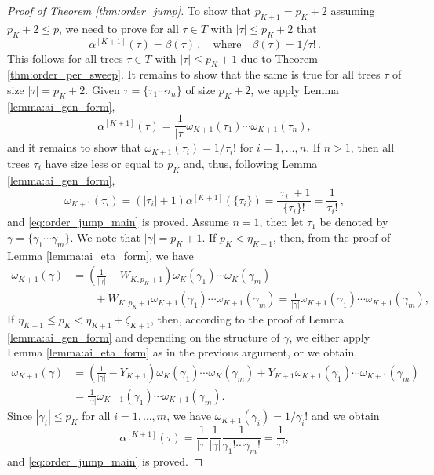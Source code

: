 \documentclass[sn-mathphys-num]{sn-jnl}%
\newcommand{\reva}[1]{#1}%
\theoremstyle{thmstyleone}%
\theoremstyle{thmstyletwo}%
\theoremstyle{thmstylethree}%
\begin{document}
\begin{proof}[Proof of Theorem \ref{thm:order_jump}]
    To show that $p_{K+1} = p_K + 2$ assuming $p_K + 2 \leq p$, we need to prove for all $\tau \in T$ with $|\tau| \leq p_K + 2$ that
    \begin{equation}
        \label{eq:order_jump_main}
        \reva{\alpha^{[K+1]}(\tau) = \beta(\tau) \,, \quad \text{where} \quad \beta(\tau) = 1/\tau! \,.}
    \end{equation}
    This follows for all trees $\tau \in T$ with $|\tau| \leq p_K + 1$ due to Theorem \ref{thm:order_per_sweep}. It remains to show that the same is true for all trees $\tau$ of size $|\tau| = p_K + 2$. 
    \reva{Given $\tau = \reva{\{\tau_1 \cdots \tau_n\}}$ of size $p_K + 2$, we apply Lemma \ref{lemma:ai_gen_form},}
    \[ \alpha^{[K+1]}(\tau) = \frac{1}{|\tau|} \reva{\omega_{K+1}(\tau_1) \cdots \omega_{K+1}(\tau_n)}, \]
    and it remains to show that $\omega_{K+1} (\tau_i) = 1/\tau_i!$ for $i= 1, \dots, n$.
    If $n > 1$, then all trees $\tau_i$ have size less or equal to $p_K$ and, \reva{thus, following Lemma \ref{lemma:ai_gen_form},
    \[ \omega_{K+1}(\tau_i) = (|\tau_i| + 1) \alpha^{[K+1]} (\{\tau_i\}) = \frac{|\tau_i| + 1}{\{\tau_i\}!} = \frac1{\tau_i!} \,, \]
and \eqref{eq:order_jump_main} is proved}. Assume $n = 1$, then let $\tau_1$ be denoted by $\gamma = \reva{\{ \gamma_1\cdots \gamma_m\}}$. We note that $|\gamma| = p_K + 1$. If $p_K < \eta_{K+1}$, then, from the proof of Lemma \ref{lemma:ai_eta_form}, we have
    \begin{align*}
        \omega_{K+1} (\gamma) &= (\frac{1}{|\gamma|} - W_{K,p_K + 1}) \reva{\omega_K (\gamma_1) \cdots \omega_K (\gamma_m)} \\
        &\quad\quad + W_{K,p_K + 1} \reva{\omega_{K+1} (\gamma_1) \cdots \omega_{K+1} (\gamma_m)} = \frac{1}{|\gamma|} \reva{\omega_{K+1} (\gamma_1) \cdots \omega_{K+1} (\gamma_m)},
    \end{align*}
    If $\eta_{K+1} \leq p_K < \eta_{K+1} + \zeta_{K+1}$, then, according to the proof of Lemma \ref{lemma:ai_gen_form} and depending on the structure of $\gamma$, we either apply Lemma \ref{lemma:ai_eta_form} \reva{as in the previous argument, or we obtain,}
    \begin{align*}
        \omega_{K+1} (\gamma) &= (\frac{1}{|\gamma|} - Y_{K+1}) \reva{\omega_K (\gamma_1) \cdots \omega_K (\gamma_m)} + Y_{K+1} \reva{\omega_{K+1} (\gamma_1) \cdots \omega_{K+1} (\gamma_m)} \\
    &= \frac{1}{|\gamma|} \reva{\omega_{K + 1}(\gamma_1) \cdots \omega_{K + 1}(\gamma_m)} .
    \end{align*}
    Since \reva{$|\gamma_i| \leq p_K$ for all $i=1,\dots,m$, we have $\omega_{K+1} (\gamma_i) = 1/\gamma_i!$} and we obtain
    \[ \alpha^{[K+1]} (\tau) = \frac{1}{|\tau|} \frac{1}{|\gamma|} \frac{1}{\gamma_1! \cdots \gamma_m!} = \frac{1}{\tau!}, \]
    and \eqref{eq:order_jump_main} is proved.
\end{proof}
\end{document}

